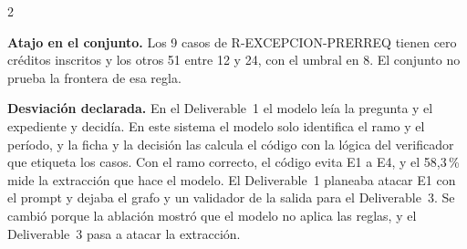 \documentclass[9pt,a4paper]{extarticle}
\newcommand{\cod}[1]{{\ttfamily\small #1}}
\begin{document}
\begin{multicols}{2}
{\textbf{Atajo en el conjunto.} Los 9 casos de \cod{R-EXCEPCION-PRERREQ} tienen cero créditos
inscritos y los otros 51 entre 12 y 24, con el umbral en 8. El conjunto no prueba la frontera de esa regla.

\textbf{Desviación declarada.} En el Deliverable~1 el modelo leía la pregunta y el
expediente y decidía. En este sistema el modelo solo identifica el ramo y el período, y la
ficha y la decisión las calcula el código con la lógica del verificador que etiqueta los casos.
Con el ramo correcto, el código evita E1 a E4, y el 58,3\,\% mide la extracción que hace el modelo. El
Deliverable~1 planeaba atacar E1 con el prompt y dejaba el grafo y un validador de la salida
para el Deliverable~3. Se cambió porque la ablación mostró que el modelo no aplica las reglas,
y el Deliverable~3 pasa a atacar la extracción.\par}

\end{multicols}
\end{document}
